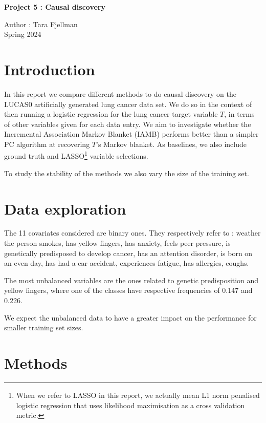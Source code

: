 \documentclass[a4paper, 12pt,oneside]{article}
\begin{document}
 
	\begin{center}
	    \Large
	    \textbf{Project 5 : Causal discovery}
	        
	    \vspace{0.4cm}
	    \large
	    Author : Tara Fjellman \\
	    \small{Spring 2024}
	\end{center}

    \section{Introduction}
    In this report we compare different methods to do causal discovery on the LUCAS0 artificially generated lung cancer data set. We do so in the context of then running a logistic regression for the lung cancer target variable $T$, in terms of other variables given for each data entry. 
    We aim to investigate whether the Incremental Association Markov Blanket (IAMB) performs better than a simpler PC algorithm at recovering $T$'s Markov blanket. As baselines, we also include ground truth and LASSO\footnote[1]{When we refer to LASSO in this report, we actually mean L1 norm penalised logistic regression that uses likelihood maximisation as a cross validation metric.} variable selections. 

    To study the stability of the methods we also vary the size of the training set.  
    \section{Data exploration}
    The 11 covariates considered are binary ones. They respectively refer to : weather the person smokes, has yellow fingers, has anxiety, feels peer pressure, is genetically predisposed to develop cancer, has an attention disorder, is born on an even day, has had a car accident, experiences fatigue, has allergies, coughs.  
    
    The most unbalanced variables are the ones related to genetic predisposition and yellow fingers, where one of the classes have respective frequencies of 0.147 and 0.226. 

    We expect the unbalanced data to have a greater impact on the performance for smaller training set sizes.
    \section{Methods}
\end{document}
